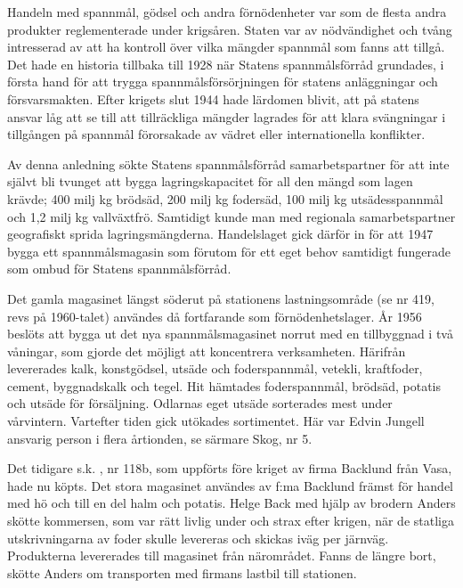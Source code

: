 {
Handeln med spannmål, gödsel och andra förnödenheter var som de flesta andra produkter reglementerade under krigsåren. Staten var av nödvändighet och tvång intresserad av att ha kontroll över vilka mängder spannmål som fanns att tillgå. Det hade en historia tillbaka till 1928 när Statens spannmålsförråd grundades, i första hand för att trygga spannmålsförsörjningen för statens anläggningar och försvarsmakten. Efter krigets slut 1944 hade lärdomen blivit, att på statens ansvar låg att se till att tillräckliga mängder lagrades för att klara svängningar i tillgången på spannmål förorsakade av vädret eller internationella konflikter.

Av denna anledning sökte Statens spannmålsförråd samarbetspartner för att inte självt bli tvunget att bygga lagringskapacitet för all den mängd som lagen krävde; 400 milj kg brödsäd, 200 milj kg fodersäd, 100 milj kg utsädesspannmål och 1,2 milj kg vallväxtfrö. Samtidigt kunde man med regionala samarbetspartner geografiskt sprida lagringsmängderna. Handelslaget gick därför in för att 1947 bygga ett spannmålsmagasin som förutom för ett eget behov samtidigt fungerade som ombud för Statens spannmålsförråd.

Det gamla magasinet längst söderut på stationens lastningsområde (se nr 419, revs på 1960-talet) användes då fortfarande som förnödenhetslager. År 1956 beslöts att bygga ut det nya spannmålsmagasinet norrut med en tillbyggnad i två våningar, som gjorde det möjligt att koncentrera verksamheten. Härifrån levererades kalk, konstgödsel, utsäde och foderspannmål, vetekli, kraftfoder, cement, byggnadskalk och tegel. Hit hämtades foderspannmål, brödsäd, potatis och utsäde för försäljning. Odlarnas eget utsäde sorterades mest under vårvintern. Vartefter tiden gick utökades sortimentet. Här var Edvin Jungell ansvarig person i flera årtionden, se särmare Skog, nr 5.


Det tidigare s.k. , nr 118b, som uppförts före kriget av firma Backlund från Vasa, hade nu köpts. Det stora magasinet användes av f:ma Backlund främst för handel med hö och till en del halm och potatis. Helge Back med hjälp av brodern Anders skötte kommersen, som var rätt livlig under och strax efter krigen, när de statliga utskrivningarna av foder skulle levereras och skickas iväg per järnväg. Produkterna levererades till magasinet från närområdet. Fanns de längre bort, skötte Anders om transporten med firmans lastbil till stationen.

}
